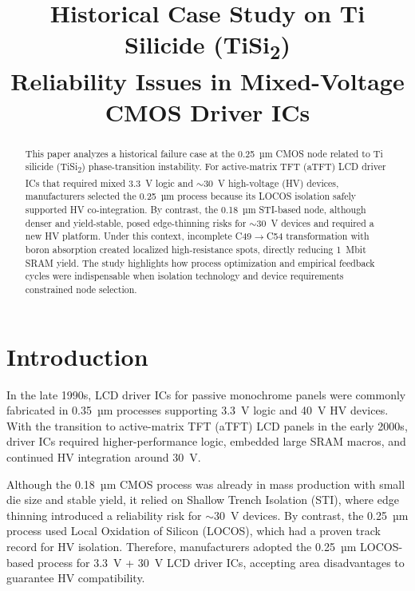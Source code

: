 \documentclass[conference]{IEEEtran}
\begin{document}
\title{Historical Case Study on Ti Silicide (TiSi\textsubscript{2}) \\ Reliability Issues in Mixed-Voltage CMOS Driver ICs}

\author{
}

\maketitle

\begin{abstract}
This paper analyzes a historical failure case at the 0.25~µm CMOS node related to Ti silicide (TiSi\textsubscript{2}) phase-transition instability. 
For active-matrix TFT (aTFT) LCD driver ICs that required mixed 3.3~V logic and $\sim$30~V high-voltage (HV) devices, manufacturers selected the 0.25~µm process because its LOCOS isolation safely supported HV co-integration. 
By contrast, the 0.18~µm STI-based node, although denser and yield-stable, posed edge-thinning risks for $\sim$30~V devices and required a new HV platform. 
Under this context, incomplete C49$\rightarrow$C54 transformation with boron absorption created localized high-resistance spots, directly reducing 1~Mbit SRAM yield. 
The study highlights how process optimization and empirical feedback cycles were indispensable when isolation technology and device requirements constrained node selection.
\end{abstract}

\section{Introduction}
In the late 1990s, LCD driver ICs for passive monochrome panels were commonly fabricated in 0.35~µm processes supporting 3.3~V logic and 40~V HV devices. 
With the transition to active-matrix TFT (aTFT) LCD panels in the early 2000s, driver ICs required higher-performance logic, embedded large SRAM macros, and continued HV integration around 30~V.  

Although the 0.18~µm CMOS process was already in mass production with small die size and stable yield, it relied on Shallow Trench Isolation (STI), where edge thinning introduced a reliability risk for $\sim$30~V devices. 
By contrast, the 0.25~µm process used Local Oxidation of Silicon (LOCOS), which had a proven track record for HV isolation. 
Therefore, manufacturers adopted the 0.25~µm LOCOS-based process for 3.3~V + 30~V LCD driver ICs, accepting area disadvantages to guarantee HV compatibility.
\end{document}
